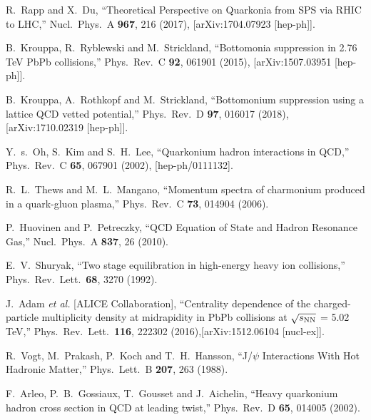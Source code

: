 \documentclass[12pt,a4paper,final]{iopart} %
\begin{document}
\begin{thebibliography}{100}
  
  R.~Rapp and X.~Du,
  ``Theoretical Perspective on Quarkonia from SPS via RHIC to LHC,''
  Nucl.\ Phys.\ A {\bf 967}, 216 (2017), [arXiv:1704.07923 [hep-ph]].


  B.~Krouppa, R.~Ryblewski and M.~Strickland,
  ``Bottomonia suppression in 2.76 TeV PbPb collisions,'' 
  Phys.\ Rev.\ C {\bf 92}, 061901 (2015),
  [arXiv:1507.03951 [hep-ph]].
  
  B.~Krouppa, A.~Rothkopf and M.~Strickland,
  ``Bottomonium suppression using a lattice QCD vetted potential,''
  Phys.\ Rev.\ D {\bf 97}, 016017 (2018), [arXiv:1710.02319 [hep-ph]].



  

  Y.~s.~Oh, S.~Kim and S.~H.~Lee,
  ``Quarkonium hadron interactions in QCD,''
  Phys.\ Rev.\ C {\bf 65}, 067901 (2002),
  [hep-ph/0111132].

  
  R.~L.~Thews and M.~L.~Mangano,
  ``Momentum spectra of charmonium produced in a quark-gluon plasma,''
  Phys.\ Rev.\ C {\bf 73}, 014904 (2006).

  
  P.~Huovinen and P.~Petreczky,
  ``QCD Equation of State and Hadron Resonance Gas,''
  Nucl.\ Phys.\ A {\bf 837}, 26 (2010).

  E.~V.~Shuryak,
  ``Two stage equilibration in high-energy heavy ion collisions,''
  Phys.\ Rev.\ Lett.\  {\bf 68}, 3270 (1992).

  J.~Adam {\it et al.} [ALICE Collaboration],
  ``Centrality dependence of the charged-particle multiplicity density at midrapidity in PbPb collisions at $\sqrt{s_{\rm NN}}$ = 5.02 TeV,''
  Phys.\ Rev.\ Lett.\  {\bf 116}, 222302 (2016),[arXiv:1512.06104 [nucl-ex]].
  
  
  R.~Vogt, M.~Prakash, P.~Koch and T.~H.~Hansson,
  ``J/$\psi$ Interactions With Hot Hadronic Matter,''
  Phys.\ Lett.\ B {\bf 207}, 263 (1988).

  F.~Arleo, P.~B.~Gossiaux, T.~Gousset and J.~Aichelin,
  ``Heavy quarkonium hadron cross section in QCD at leading twist,''
  Phys.\ Rev.\ D {\bf 65}, 014005 (2002).


\end{thebibliography}
\end{document}
